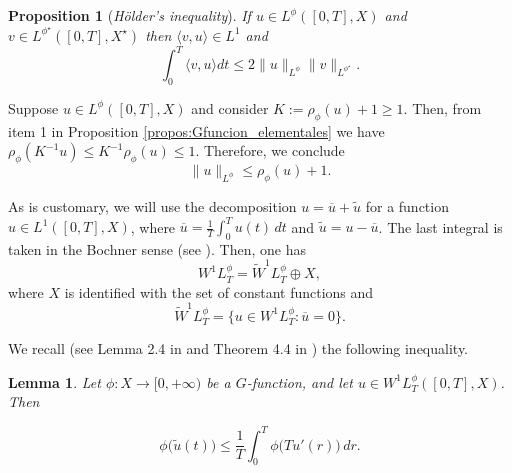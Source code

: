 \documentclass[twoside]{article}
\theoremstyle{definition}
\theoremstyle{plain}
\newtheorem{lem}[definition]{Lemma}
\newtheorem{Propos}[definition]{Proposition}
\theoremstyle{remark}
\newcommand{\orlnor}{\|_{L^{\phi}}}
\newcommand{\lphi}{L^{\phi}}
\newcommand{\lpsi}{L^{\phi^{\star}}}
\newcommand{\wphit}{W^{1}\lphi_T}
\newcommand{\wphittilde}{\widetilde{W}^1\lphi_T}
\begin{document}
 \begin{Propos}[\emph{H\"older's inequality}] If $u\in\lphi([0,T],X)$ and $v\in\lpsi([0,T],X^\star)$ then $\langle  v,u \rangle   \in L^1$ and
\begin{equation}\label{holder}
\int_0^T \langle v,u \rangle   dt\leq 2 \|u\orlnor\|v\|_{L^{\phi^{\star}}}.
\end{equation}
 \end{Propos}


Suppose $u\in\lphi([0,T],X)$ and consider $K:=\rho_{\phi}(u)+1\geq 1$. Then, from item 1 in Proposition \ref{propos:Gfuncion_elementales} we have $\rho_{\phi}(K^{-1}u)\leq K^{-1}\rho_{\phi}(u)\leq 1$. Therefore, we conclude
\begin{equation}\label{eq:amemiya}
 \|u\orlnor \leq \rho_{\phi}(u)+1.
\end{equation}


 
As is customary, we will use the decomposition $u=\overline{u}+\widetilde{u}$ for a function $u\in L^1([0,T],X)$,  where $\overline{u} =\frac1T\int_0^T u(t)\, dt$ and $\widetilde{u}=u-\overline{u}$. The last integral is taken in the Bochner sense (see \cite{papageorgiou2009handbook}). Then, one has
\[\wphit=\wphittilde\oplus X, \]
where  $X$  is identified with the set of constant functions and   \[\wphittilde=\{u \in \wphit: \overline{u}=0  \}.\]




We recall   (see Lemma 2.4 in \cite{Mazzone2019} and Theorem 4.4 in \cite{chamra2017anisotropic}) the following inequality.

\begin{lem}
\label{lem:inclusion orliczII} Let $\phi:X\to [0,+\infty)$ be a $G$-function,
and let $u\in\wphit\left([0,T],X\right)$. Then

\begin{equation}\label{eq:wirtinger}
  \phi\big(\tilde{u}(t)\big)\leq\frac{1}{T} \int_0^T \phi\big(Tu'(r)\big)\,dr.
\end{equation}

\end{lem}
\end{document}
